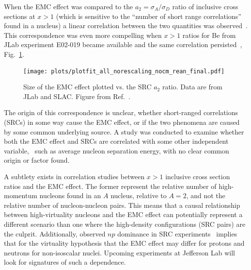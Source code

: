 When the EMC effect was compared to the $a_2=\sigma_A/\sigma_D$ ratio of
inclusive cross sections at $x>1$ (which is sensitive to the ``number of short range correlations''
found in a nucleus) a linear correlation between the two quantities was observed~\cite{Weinstein:2010rt}.
This correspondence was even more compelling when $x>1$ ratios for Be from JLab experiment E02-019 became
available and the same correlation persisted~\cite{Arrington:2012ax, Hen:2012fm}, Fig.~\ref{fig:emc_src_bff}.

\begin{figure}[tbp]
  \centering\texttt{[image: plots/plotfit\_all\_norescaling\_nocm\_rean\_final.pdf]}
  \caption{Size of the EMC effect plotted vs. the SRC $a_2$ ratio. Data are from JLab and SLAC. Figure
  from Ref.~\cite{Arrington:2012ax}.}
  \label{fig:emc_src_bff}
\end{figure}

The origin of this correspondence is unclear, whether short-ranged correlations (SRCs) in some way cause the EMC effect, or if the two
phenomena are caused by some common underlying source.  A study was conducted to examine whether
both the EMC effect and SRCs are correlated with some other independent variable,~\cite{Arrington:2012ax} such
as average nucleon separation energy, with no clear common origin or factor found.

A subtlety exists in correlation studies between $x>1$ inclusive cross section ratios and the EMC effect.  The former represent the relative number of high-momentum nucleons found in an $A$ nucleus, relative to $A=2$, and not the relative number of nucleon-nucleon pairs.  This means that a causal relationship between high-virtuality nucleons and the EMC effect can potentially represent a different scenario than one where the high-density configurations (SRC pairs) are the culprit.  Additionally, observed $np$ dominance in SRC experiments~\cite{Subedi:2008zz} implies that for the virtuality hypothesis that the EMC effect may differ for protons and neutrons for non-isoscalar nuclei.  Upcoming experiments at Jefferson Lab will look for signatures of such a dependence. 

